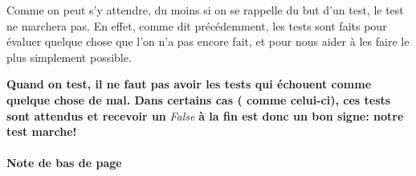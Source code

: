 \documentclass[letterpaper,10pt,french]{sphinxmanual}
\begin{document}
Comme on peut s'y attendre, du moins si on se rappelle du but d'un test, le test
ne marchera pas. En effet, comme dit précédemment, les tests sont faits pour
évaluer quelque chose que l'on n'a pas encore fait, et pour nous aider à les
faire le plus simplement possible.

\textbf{Quand on test, il ne faut pas avoir les tests qui échouent comme quelque chose
de mal. Dans certains cas ( comme celui-ci), ces tests sont attendus et recevoir
un} \emph{False} \textbf{à la fin est donc un bon signe: notre test marche!}
\paragraph{Note de bas de page}



\renewcommand{\indexname}{Index}
\printindex
\end{document}
